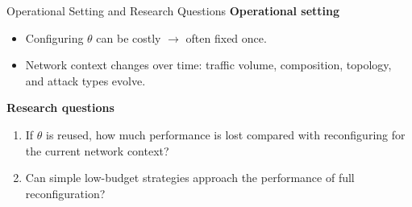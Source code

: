 \begin{frame}{Operational Setting and Research Questions}
    \small
    {\color{structure.fg}\textbf{Operational setting}}
    \vspace{0.2em}
    \begin{itemize}
        \setlength\itemsep{0.6em}
        \item Configuring \(\theta\) can be costly \(\rightarrow\) often fixed once.
        \item Network context changes over time: traffic volume, composition, topology, and attack types evolve.
    \end{itemize}

    \vspace{0.55em}
    {\color{structure.fg}\textbf{Research questions}}
    \vspace{0.2em}
    \begin{enumerate}
        \setlength\itemsep{0.6em}
        \item If \(\theta\) is reused, how much performance is lost compared with reconfiguring for the current network context?
        \item Can simple low-budget strategies approach the performance of full reconfiguration?
    \end{enumerate}
\end{frame}

